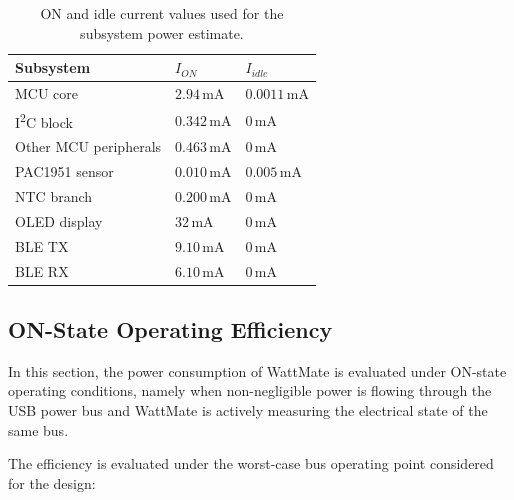 \begin{table}[H]
	\centering
	\small
	\caption{ON and idle current values used for the subsystem power estimate.}
	\label{tab:on_idle_currents_subsystems}
	\begin{tabular}{p{} p{} p{}}
		\toprule
		\textbf{Subsystem} & \textbf{\(I_{ON}\)} & \textbf{\(I_{idle}\)} \\
		\midrule
		MCU core &
		\(2.94\,\mathrm{mA}\) &
		\(0.0011\,\mathrm{mA}\) \\
		
		I\textsuperscript{2}C block &
		\(0.342\,\mathrm{mA}\) &
		\(0\,\mathrm{mA}\) \\
		
		Other MCU peripherals &
		\(0.463\,\mathrm{mA}\) &
		\(0\,\mathrm{mA}\) \\
		
		PAC1951 sensor &
		\(0.010\,\mathrm{mA}\) &
		\(0.005\,\mathrm{mA}\) \\
		
		NTC branch &
		\(0.200\,\mathrm{mA}\) &
		\(0\,\mathrm{mA}\) \\
		
		OLED display &
		\(32\,\mathrm{mA}\) &
		\(0\,\mathrm{mA}\) \\
		
		BLE TX &
		\(9.10\,\mathrm{mA}\) &
		\(0\,\mathrm{mA}\) \\
		
		BLE RX &
		\(6.10\,\mathrm{mA}\) &
		\(0\,\mathrm{mA}\) \\
		\bottomrule
	\end{tabular}
\end{table}













\subsection{ON-State Operating Efficiency}
\label{sec:operating_efficiency}

In this section, the power consumption of WattMate is evaluated under ON-state operating conditions, namely when non-negligible power is flowing through the USB power bus and WattMate is actively measuring the electrical state of the same bus.

The efficiency is evaluated under the worst-case bus operating point considered for the design:

